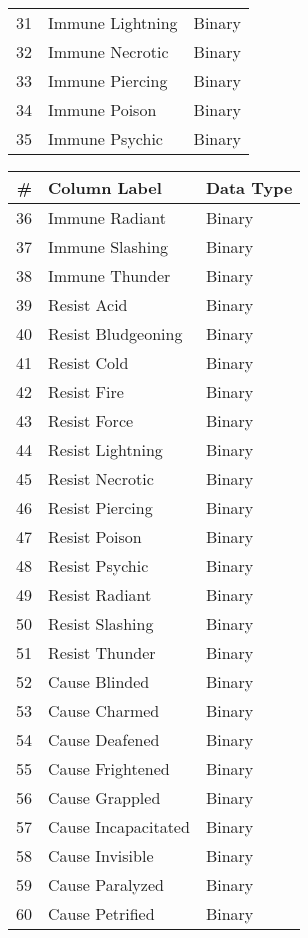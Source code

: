 \documentclass[12pt]{diazessay}
\begin{document}
\begin{table}[!htbp]
\begin{footnotesize}
\begin{minipage}[b]{0.45\linewidth}
\begin{longtable}[]{@{}rll@{}}
	31 & Immune Lightning & Binary \\
	32 & Immune Necrotic & Binary \\
	33 & Immune Piercing & Binary \\
	34 & Immune Poison & Binary \\
	35 & Immune Psychic & Binary \\
	\bottomrule
\end{longtable}
\end{minipage}
\hspace{0.5cm}
\begin{minipage}[b]{0.45\linewidth}\centering
\begin{longtable}{@{}rll@{}}
	\toprule
	\# & Column Label & Data Type \\
	\midrule
	\endhead
	36 & Immune Radiant & Binary \\
	37 & Immune Slashing & Binary \\
	38 & Immune Thunder & Binary \\
	39 & Resist Acid & Binary \\
	40 & Resist Bludgeoning & Binary \\
	41 & Resist Cold & Binary \\
	42 & Resist Fire & Binary \\
	43 & Resist Force & Binary \\
	44 & Resist Lightning & Binary \\
	45 & Resist Necrotic & Binary \\
	46 & Resist Piercing & Binary \\
	47 & Resist Poison & Binary \\
	48 & Resist Psychic & Binary \\
	49 & Resist Radiant & Binary \\
	50 & Resist Slashing & Binary \\
	51 & Resist Thunder & Binary \\
	52 & Cause Blinded & Binary \\
	53 & Cause Charmed & Binary \\
	54 & Cause Deafened & Binary \\
	55 & Cause Frightened & Binary \\
	56 & Cause Grappled & Binary \\
	57 & Cause Incapacitated & Binary \\
	58 & Cause Invisible & Binary \\
	59 & Cause Paralyzed & Binary \\
	60 & Cause Petrified & Binary \\

\end{longtable}
\end{minipage}
\end{footnotesize}
\end{table}
\end{document}
